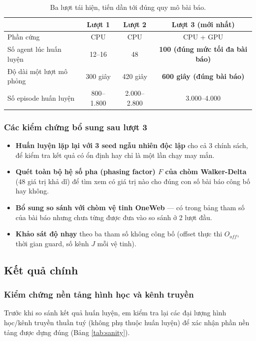\documentclass{article} %
\begin{document}
\begin{table}[h!]
\centering
\caption{Ba lượt tái hiện, tiến dần tới đúng quy mô bài báo.}
\label{tab:rounds}
\begin{tabular}{|l|c|c|c|}
\hline
 & \textbf{Lượt 1} & \textbf{Lượt 2} & \textbf{Lượt 3 (mới nhất)} \\
\hline
Phần cứng & CPU & CPU & CPU + GPU \\
\hline
Số agent lúc huấn luyện & 12--16 & 48 & \textbf{100 (đúng mức tối đa bài báo)} \\
\hline
Độ dài một lượt mô phỏng & 300 giây & 420 giây & \textbf{600 giây (đúng bài báo)} \\
\hline
Số episode huấn luyện & 800--1.800 & 2.000--2.800 & 3.000--4.000 \\
\hline
\end{tabular}
\end{table}

\subsubsection{Các kiểm chứng bổ sung sau lượt 3}
\begin{itemize}
    \item \textbf{Huấn luyện lặp lại với 3 seed ngẫu nhiên độc lập} cho cả 3 chính sách, để kiểm tra kết quả có ổn định hay chỉ là một lần chạy may mắn.
    \item \textbf{Quét toàn bộ hệ số pha (phasing factor) $F$ của chòm Walker-Delta} (48 giá trị khả dĩ) để tìm xem có giá trị nào cho đúng con số bài báo công bố hay không.
    \item \textbf{Bổ sung so sánh với chòm vệ tinh OneWeb} — có trong bảng tham số của bài báo nhưng chưa từng được đưa vào so sánh ở 2 lượt đầu.
    \item \textbf{Khảo sát độ nhạy} theo ba tham số không công bố (offset thực thi $O_{off}$, thời gian guard, số kênh $J$ mỗi vệ tinh).
\end{itemize}

\subsection{Kết quả chính}
\subsubsection{Kiểm chứng nền tảng hình học và kênh truyền}
Trước khi so sánh kết quả huấn luyện, em kiểm tra lại các đại lượng hình học/kênh truyền thuần tuý (không phụ thuộc huấn luyện) để xác nhận phần nền tảng được dựng đúng (Bảng \ref{tab:sanity}).
\end{document}
